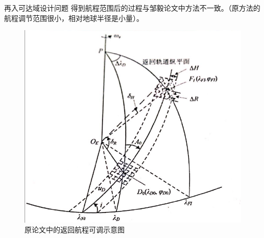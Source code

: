 \documentclass[11pt,UTF8]{ctexbeamer}
\begin{document}
\begin{frame}{再入可达域设计问题}
	得到航程范围后的过程与邹毅论文中方法不一致。（原方法的航程调节范围很小，相对地球半径是小量）。\\
	\begin{figure}[]
		\centering
		\includegraphics[height=.6\textheight]{old_method.png}
		\caption{原论文中的返回航程可调示意图}
	\end{figure}
\end{frame}
\end{document}
